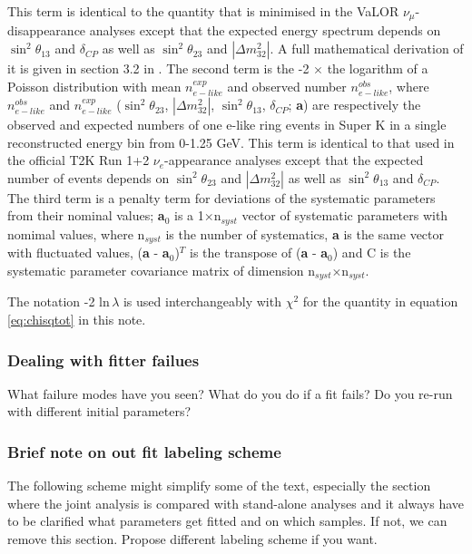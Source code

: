 This term is identical to the quantity that is minimised in the VaLOR $\nu_{\mu}$-disappearance analyses 
\cite{OurRun1DisappAnalysis2F, OurRun1and2Analysis2F, OurRun1and2Analysis3F, OurRun1and2and3Analysis3F} except that the expected energy spectrum 
depends on $\sin^{2}\theta_{13}$ and $\delta_{CP}$ as well as $\sin^{2}\theta_{23}$ and $|\Delta m^{2}_{32}|$. A full mathematical derivation of 
it is given in section 3.2 in \cite{OurRun1DisappAnalysis2F}. 
The second term is the -2 $\times$ the logarithm of a Poisson distribution with mean $n_{e-like}^{exp}$ and observed number $n_{e-like}^{obs}$, 
where $n_{e-like}^{obs}$ and $n_{e-like}^{exp}$ ($\sin^{2}\theta_{23}$, $|\Delta m^{2}_{32}|$, $\sin^{2}\theta_{13}$, $\delta_{CP}$; {\bf a}) 
are respectively the observed and expected numbers of one e-like ring events in Super K in a single reconstructed energy bin from 0-1.25 GeV. 
This term is identical to that used in the official T2K Run 1+2 $\nu_{e}$-appearance analyses \cite{NueRun1and2Analysis} except that the expected 
number of events depends on $\sin^{2}\theta_{23}$ and $|\Delta m^{2}_{32}|$ as well as $\sin^{2}\theta_{13}$ and $\delta_{CP}$. The third term is 
a penalty term for deviations of the systematic parameters from their nominal values; {\bf a$_{0}$} is a 1$\times$n$_{syst}$ vector of systematic 
parameters with nomimal values, where n$_{syst}$ is the number of systematics, {\bf a} is the same vector with fluctuated values, 
({\bf a} - {\bf a$_{0}$})$^{T}$ is the transpose of ({\bf a} - {\bf a$_{0}$}) and C is the systematic parameter covariance matrix of dimension 
n$_{syst}$$\times$n$_{syst}$. 

The notation -2 ln$\, \lambda$ is used interchangeably with $\chi^{2}$ for the quantity in equation \ref{eq:chisqtot} in this note. 

\subsubsection{Dealing with fitter failues}

{\color{red} What failure modes have you seen? What do you do if a fit fails? Do you re-run with different initial parameters?}


\subsubsection {Brief note on out fit labeling scheme}
\label{sec:oscfit_method_label}

{\color{red} The following scheme might simplify some of the text, especially the section where the joint analysis
is compared with stand-alone analyses and it always have to be clarified what parameters get fitted and on which samples.
If not, we can remove this section. Propose different labeling scheme if you want. }


